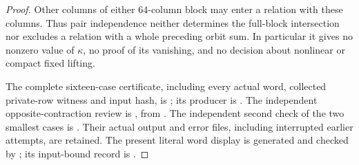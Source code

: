 \begin{proof}
Other columns of either $64$-column block may enter a relation
with these columns.  Thus pair independence neither determines
the full-block intersection nor excludes a relation with a
whole preceding orbit sum.  In particular it gives no nonzero
value of $\kappa$, no proof of its vanishing, and no decision
about nonlinear or compact fixed lifting.

\begingroup\raggedright
The complete sixteen-case certificate, including every actual
word, collected private-row witness and input hash, is
; its producer
is .
The independent opposite-contraction review is
,
from .
The independent second check of the two smallest cases is
.
Their actual output and error files, including interrupted
earlier attempts, are retained.  The present literal word display
is generated and checked by
; its input-bound record
is .\par
\endgroup
\end{proof}

